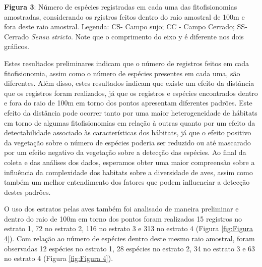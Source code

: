 \textbf{Figura 3}: Número de espécies registradas em cada uma das fitofisionomias amostradas, considerando os rgistros feitos dentro do raio amostral de 100m e fora deste raio amostral. Legenda: CS- Campo sujo; CC -  Campo Cerrado; SS- Cerrado \textit{Sensu stricto}. Note que o comprimento do eixo y é diferente nos dois gráficos.

Estes resultados preliminares indicam que o número de registros feitos em cada fitofisionomia, assim como o número de espécies presentes em cada uma, são diferentes. Além disso, estes resultados indicam que existe um efeito da distância que os registros foram realizados, já que os registros e espécies encontrados dentro e fora do raio de 100m em torno dos pontos apresentam diferentes padrões. Este efeito da distância pode ocorrer tanto por uma maior heterogeneidade de hábitats em torno de algumas fitofisionomias em relação à outras quanto por um efeito da detectabilidade associado às características dos hábitats, já que o efeito positivo da vegetação sobre o número de espécies poderia ser reduzido ou até mascarado por um efeito negativo da vegetação sobre a detecção das espécies. Ao final da coleta e das análises dos dados, esperamos obter uma maior compreensão sobre a influência da complexidade dos habitats sobre a diversidade de aves, assim como também um melhor entendimento dos fatores que podem influenciar a detecção destes padrões. 

O uso dos estratos pelas aves também foi analisado de maneira preliminar e dentro do raio de 100m em torno dos pontos foram realizados 15 registros no estrato 1, 72 no estrato 2, 116 no estrato 3 e 313 no estrato 4 (Figura \ref{fig:Figura 4}). Com relação ao número de espécies dentro deste mesmo raio amostral, foram observadas 12 espécies no estrato 1, 28 espécies no estrato 2, 34 no estrato 3 e 63 no estrato 4 (Figura \ref{fig:Figura 4}).